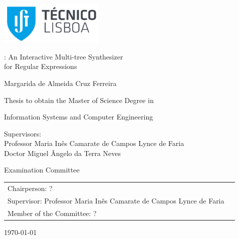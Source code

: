 \thispagestyle {empty}

\includegraphics[width=5cm]{pictures/IST_A.pdf}

\begin{center}

\vspace{2.5cm}
\vspace{1.0cm}
{\FontLb \Forest: An Interactive Multi-tree Synthesizer\\for Regular Expressions}


\vspace{2.7cm}
{\FontMb Margarida de Almeida Cruz Ferreira}

\vspace{2.0cm}
{\FontSn Thesis to obtain the Master of Science Degree in}

\vspace{0.3cm}
{\FontLb Information Systems and Computer Engineering}

\vspace{1.1cm}
{\FontSn %
	Supervisors:\\
	Professor Maria Inês Camarate de Campos Lynce de Faria\\
	Doctor Miguel Ângelo da Terra Neves

}

\vspace{1.1cm}
{\FontMb Examination Committee} \\

\vspace{0.5cm}
{
\FontSn %
\begin{tabular}{ll}
Chairperson: ? \\
Supervisor: Professor Maria Inês Camarate de Campos Lynce de Faria \\
Member of the Committee: ? \\
\end{tabular}
}

\vspace{1.5cm}
{\FontMb \monthyeardate\today}

\end{center}

\cleardoublepage

